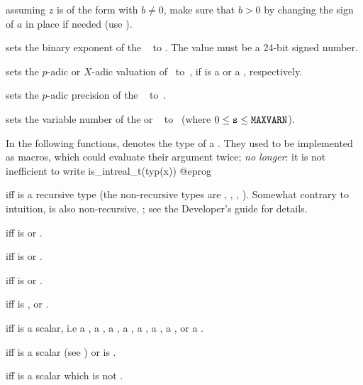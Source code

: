  assuming $z$ is of the form 
with $b\neq 0$, make sure that $b > 0$ by changing the sign of $a$ in place if
needed (use ).

 sets the binary exponent of the
~ to . The value  must be a 24-bit signed
number.

 sets the $p$-adic or $X$-adic valuation
of~ to~, if  is a  or a ,
respectively.

 sets the $p$-adic precision of the
~ to~.

 sets the variable number of the 
or ~ to~ (where $0\le {\tt s}\le{\tt MAXVARN}$).

\label{se:typegroup}
In the following functions,  denotes the type of a .
They used to be implemented as macros, which could evaluate their argument
twice; \emph{no longer}: it is not inefficient to write
\bprog
  is_intreal_t(typ(x))
@eprog

  iff  is a recursive
type (the non-recursive types are , ,
, ). Somewhat contrary to intuition,  is
also non-recursive, ; see the Developer's guide for details.

  iff  is 
or .

  iff  is 
or .

  iff  is 
or .

  iff  is , 
or .

  iff  is a scalar, i.e
a ,
a ,
a ,
a ,
a ,
a ,
a ,
or
a .

  iff  is a scalar (see
) or  is .

  iff  is a scalar which is not
.

